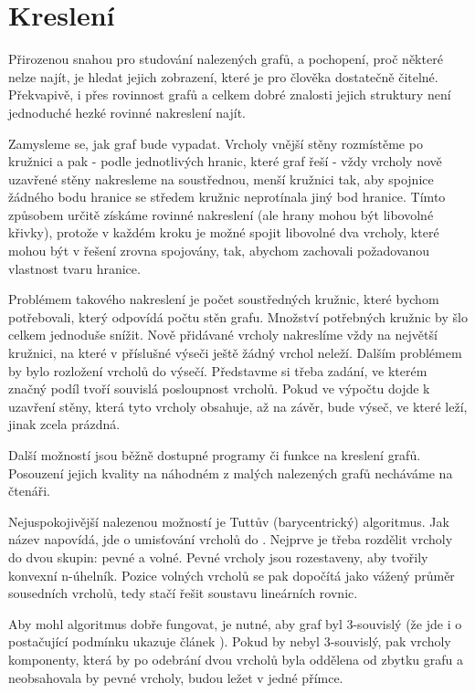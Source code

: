 
\chapter{Kreslení} \label{kresleni}

Přirozenou snahou pro studování nalezených grafů, a pochopení, proč některé nelze najít, je hledat jejich zobrazení, které je pro člověka dostatečně čitelné. Překvapivě, i přes rovinnost grafů a celkem dobré znalosti jejich struktury není jednoduché hezké rovinné nakreslení najít.

Zamysleme se, jak graf bude vypadat. Vrcholy vnější stěny rozmístěme po kružnici a pak - podle jednotlivých hranic, které graf řeší - vždy vrcholy nově uzavřené stěny nakresleme na soustřednou, menší kružnici tak, aby spojnice žádného bodu hranice se středem kružnic neprotínala jiný bod hranice. Tímto způsobem určitě získáme rovinné nakreslení (ale hrany mohou být libovolné křivky), protože v každém kroku je možné spojit libovolné dva vrcholy, které mohou být v řešení zrovna spojovány, tak, abychom zachovali požadovanou vlastnost tvaru hranice.

Problémem takového nakreslení je počet soustředných kružnic, které bychom potřebovali, který odpovídá počtu stěn grafu. Množství potřebných kružnic by šlo celkem jednoduše snížit. Nově přidávané vrcholy nakreslíme vždy na největší kružnici, na které v příslušné výseči ještě žádný vrchol neleží. Dalším problémem by bylo rozložení vrcholů do výsečí. Představme si třeba zadání, ve kterém značný podíl tvoří souvislá posloupnost  vrcholů. Pokud ve výpočtu dojde k uzavření stěny, která tyto vrcholy obsahuje, až na závěr, bude výseč, ve které leží, jinak zcela prázdná.

Další možností jsou běžně dostupné programy či funkce na kreslení grafů. Posouzení jejich kvality na náhodném z malých nalezených grafů necháváme na čtenáři.

Nejuspokojivější nalezenou možností je Tuttův (barycentrický) algoritmus. Jak název napovídá, jde o umisťování vrcholů do . Nejprve je třeba rozdělit vrcholy do dvou skupin: pevné a volné. Pevné vrcholy jsou rozestaveny, aby tvořily konvexní n-úhelník. Pozice volných vrcholů se pak dopočítá jako vážený průměr sousedních vrcholů, tedy stačí řešit soustavu lineárních rovnic.

Aby mohl algoritmus dobře fungovat, je nutné, aby graf byl 3-souvislý (že jde i o postačující podmínku ukazuje článek  \cite{Tutte}). Pokud by nebyl 3-souvislý, pak vrcholy komponenty, která by po odebrání dvou vrcholů byla oddělena od zbytku grafu a neobsahovala by pevné vrcholy, budou ležet v jedné přímce.

